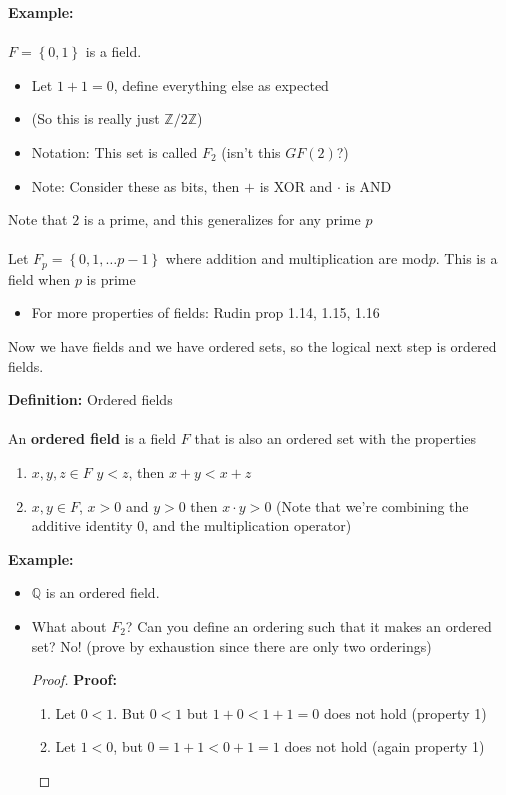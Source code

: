 \documentclass{article}
\newcommand{\Z}{\mathbb{Z}}
\newcommand{\Q}{\mathbb{Q}}
\begin{document}
\begin{example} 
\textbf{Example:}  \\
~\\
$F = \left\{ 0,1 \right\}$ is a field.
\begin{itemize}
	\item Let $1+1 = 0$, define everything else as expected
	\item (So this is really just $\Z /2\Z$)
	\item Notation: This set is called $F_2$ (isn't this $GF(2)$?)
	\item Note: Consider these as bits, then $+$ is XOR and $\cdot$ is AND
\end{itemize}
Note that $2$ is a prime, and this generalizes for any prime $p$ \\
~\\
Let $F_p = \left\{ 0,1,\ldots p-1 \right\}$ where addition and multiplication are mod$p$. This is a field when $p$ is prime
\begin{itemize}
	\item For more properties of fields: Rudin prop 1.14, 1.15, 1.16
\end{itemize}
\end{example}
Now we have fields and we have ordered sets, so the logical next step is ordered fields.
\begin{definition} 
\textbf{Definition:} Ordered fields \\
~\\
An {\color{blue} \textbf{ordered field}} is a field $F$ that is also an ordered set with the properties
\begin{enumerate}
	\item $x,y,z\in F$ $y<z$, then $x+y<x+z$
	\item $x,y\in F$, $x>0 $ and $y>0$ then $x\cdot y >0$ (Note that we're combining the additive identity $0$, and the multiplication operator)
\end{enumerate}
\end{definition}
\begin{example} 
\textbf{Example:}
\begin{itemize}
	\item $\Q$ is an ordered field.
	\item What about $F_2$? Can you define an ordering such that it makes an ordered set? No! (prove by exhaustion since there are only two orderings)
	\begin{proof} 
	\textbf{Proof:}
	\begin{enumerate}
		\item Let $0<1$. But $0<1$ but $1+0 < 1 + 1 = 0$ does not hold (property 1)
		\item Let $1<0$, but $ 0 = 1+1 < 0+1 = 1$ does not hold (again property 1)
	\end{enumerate}
	\end{proof}
\end{itemize}
\end{example}
\end{document}
